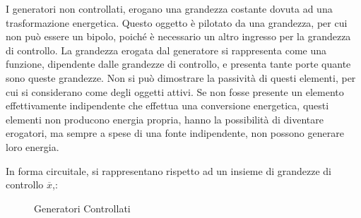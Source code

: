 \documentclass{article}
\numberwithin{equation}{subsection}
\begin{document}
I generatori non controllati, erogano una grandezza costante dovuta ad una trasformazione energetica. Questo oggetto è pilotato da una grandezza, per cui non può essere 
un bipolo, poiché è necessario un altro ingresso per la grandezza di controllo. La grandezza erogata dal generatore si rappresenta come una funzione, dipendente dalle 
grandezze di controllo, e presenta tante porte quante sono queste grandezze. Non si può dimostrare la passività di questi elementi, per cui si considerano come degli oggetti 
attivi. 
Se non fosse presente un elemento effettivamente indipendente che effettua una conversione energetica, questi elementi non producono energia propria, hanno la possibilità di 
diventare erogatori, ma sempre a spese di una fonte indipendente, non possono generare loro energia. 


In forma circuitale, si rappresentano rispetto ad un insieme di grandezze di controllo $\overline{x}$,: 
\begin{figure}[H]%
    \centering
    \qquad
    \caption{Generatori Controllati}
    \label{fig:generatori-controllati}
\end{figure}
\end{document}
